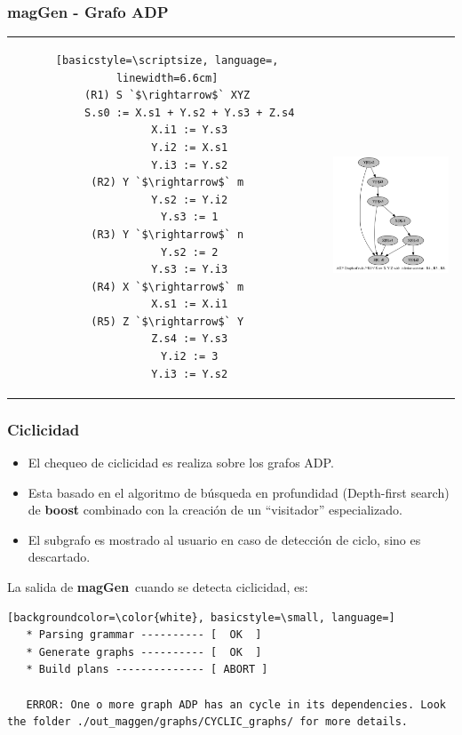 \documentclass[10pt]{beamer}
\newcommand{\maggen}{\textbf{magGen}}
\begin{document}
\begin{frame}[fragile]
    \frametitle{magGen - Grafo ADP}
\begin{tabular}{c p{4.5cm}}
\hspace{-0.5cm}\begin{lstlisting}[basicstyle=\scriptsize, language=, linewidth=6.6cm]
(R1) S `$\rightarrow$` XYZ
       S.s0 := X.s1 + Y.s2 + Y.s3 + Z.s4
       X.i1 := Y.s3
       Y.i2 := X.s1
       Y.i3 := Y.s2
(R2) Y `$\rightarrow$` m
       Y.s2 := Y.i2
       Y.s3 := 1
(R3) Y `$\rightarrow$` n
       Y.s2 := 2
       Y.s3 := Y.i3
(R4) X `$\rightarrow$` m
       X.s1 := X.i1
(R5) Z `$\rightarrow$` Y
       Z.s4 := Y.s3
       Y.i2 := 3
       Y.i3 := Y.s2
\end{lstlisting}
&\hspace{0.2cm}\parbox[c]{1em}{\includegraphics[width=149px, height=150px]{./16_adp_graph.png}}
\end{tabular}

\end{frame}

\begin{frame}[fragile]
    \frametitle{Ciclicidad}

    \begin{block}{}
	\begin{itemize}
	    \item El chequeo de ciclicidad es realiza sobre los grafos ADP.
	    \pause
	    \item Esta basado en el algoritmo de búsqueda en profundidad (Depth-first search) de \textbf{boost} combinado con la creación de un ``visitador'' especializado.
	    \pause
	    \item El subgrafo es mostrado al usuario en caso de detección de ciclo, sino es descartado.
	\end{itemize}
    \end{block}
    \pause

La salida de \maggen\ cuando se detecta ciclicidad, es:

\begin{lstlisting}[backgroundcolor=\color{white}, basicstyle=\small, language=] 
   * Parsing grammar ---------- [  OK  ]
   * Generate graphs ---------- [  OK  ]
   * Build plans -------------- [ ABORT ]

   ERROR: One o more graph ADP has an cycle in its dependencies. Look the folder ./out_maggen/graphs/CYCLIC_graphs/ for more details.
\end{lstlisting}
\end{frame}
\end{document}
